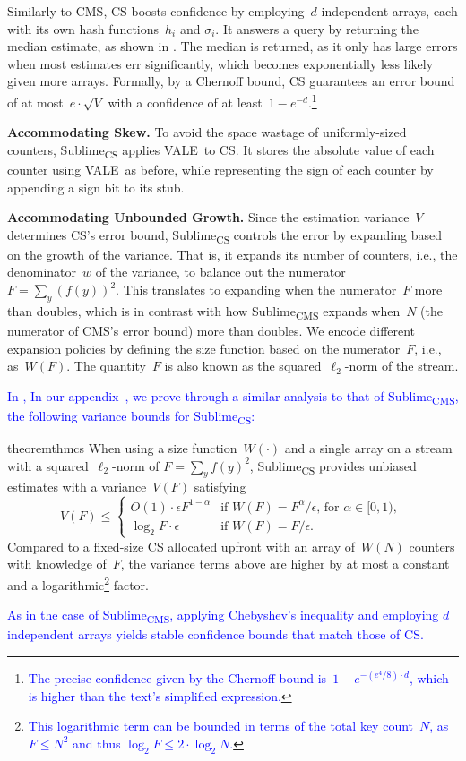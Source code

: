 \documentclass[sigconf]{acmart}
\newcommand{\sketch}{Sublime}
\newcommand{\sketchcms}{\sketch\textsubscript{CMS}\xspace}
\newcommand{\sketchcs}{\sketch\textsubscript{CS}\xspace}
\newcommand{\counterencodingabbrv}{VALE}
\begin{document}
Similarly to CMS, CS boosts confidence by employing~$d$ independent arrays,
each with its own hash functions~$h_i$ and $\sigma_i$. It answers a query by
returning the median estimate, as shown in . The median
is returned, as it only has large errors when most estimates err significantly,
which becomes exponentially less likely given more arrays. Formally, by a
Chernoff bound, CS guarantees an error bound of at most~$e \cdot \sqrt{V}$ with
a confidence of at least~$1-e^{-d}$.\footnote{\textcolor{blue}{The precise
confidence given by the Chernoff bound is~$1-e^{-(e^4/8) \cdot d}$, which is
higher than the text's simplified expression.}}

\textbf{Accommodating Skew.}
To avoid the space wastage of uniformly-sized counters, \sketchcs applies
\counterencodingabbrv\ to CS. It stores the absolute value of each counter
using \counterencodingabbrv\ as before, while representing the sign of each
counter by appending a sign bit to its stub. 

\textbf{Accommodating Unbounded Growth.}
Since the estimation variance~$V$ determines CS's error bound, \sketchcs
controls the error by expanding based on the growth of the variance. That is,
it expands its number of counters, i.e., the denominator~$w$ of the variance,
to balance out the numerator~$F=\sum_{y} (f(y))^2$. This translates to
expanding when the numerator~$F$ more than doubles, which is in contrast with
how \sketchcms expands when~$N$ (the numerator of CMS's error bound) more than
doubles. We encode different expansion policies by defining the size function
based on the numerator~$F$, i.e., as~$W(F)$. The quantity~$F$ is also known as
the squared~$\ell_2$-norm of the stream.

\textcolor{blue}{
\ifappendix
In ,
\else 
In our appendix~\cite{SublimeArxiv},
\fi
we prove through a similar analysis to that of \sketchcms, the following
variance bounds for \sketchcs:
}
\begin{restatable}{theorem}{thmcs}
    \label{thm:cs-w}
    When using a size function~$W(\cdot)$ and a single array on a stream with a
    squared~$\ell_2$-norm of $F = \sum_y f(y)^2$, \sketchcs provides unbiased
    estimates with a variance~$V(F)$ satisfying
	$$
    V(F) \leq  
    \begin{cases}
        O(1) \cdot \epsilon F^{1-\alpha} & \text{if $W(F)=F^{\alpha}/\epsilon$, for $\alpha \in [0,1)$, } \\
        \log_2 F \cdot \epsilon & \text{if $W(F)=F/\epsilon$.}
	\end{cases}
    $$
    Compared to a fixed-size CS allocated upfront with an array of~$W(N)$
    counters with  knowledge of~$F$, the variance terms above are higher by at
    most a constant and a logarithmic\footnote{\textcolor{blue}{This
    logarithmic term can be bounded in terms of the total key count~$N$, as $F
    \leq N^2$ and thus $\log_2 F \leq 2 \cdot \log_2 N$.}} factor.
\end{restatable}
\textcolor{blue}{
As in the case of \sketchcms, applying Chebyshev's inequality and employing $d$
independent arrays yields stable confidence bounds that match those of CS.
}
\end{document}
